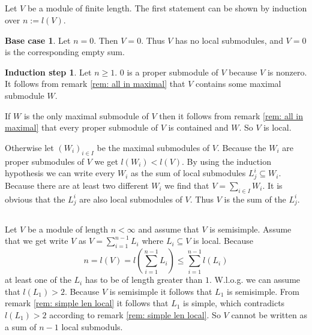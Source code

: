 \documentclass[a4paper,10pt]{article}
\theoremstyle{definition}
\newtheorem*{ia}{Base case}
\newtheorem*{is}{Induction step}
\begin{document}
\subsection{}
Let $V$ be a module of finite length.
The first statement can be shown by induction over $n := l(V)$.
\begin{ia}
 Let $n=0$. Then $V = 0$. Thus $V$ has no local submodules, and $V = 0$ is the corresponding empty sum.
\end{ia}
\begin{is}
 Let $n \geq 1$. $0$ is a proper submodule of $V$ because $V$ is nonzero. It follows from remark \ref{rem: all in maximal} that $V$ contains some maximal submodule $W$.
 
 If $W$ is the only maximal submodule of $V$ then it follows from remark \ref{rem: all in maximal} that every proper submodule of $V$ is contained and $W$. So $V$ is local.
 
 Otherwise let $(W_i)_{i \in I}$ be the maximal submodules of $V$. Because the $W_i$ are proper submodules of $V$ we get $l(W_i) < l(V)$. By using the induction hypothesis we can write every $W_i$ as the sum of local submodules $L^i_j \subseteq W_i$. Because there are at least two different $W_i$ we find that $V = \sum_{i \in I} W_i$. It is obvious that the $L^i_j$ are also local submodules of $V$. Thus $V$ is the sum of the $L^i_j$.
\end{is}


\subsection{}
Let $V$ be a module of length $n < \infty$ and assume that $V$ is semisimple. Assume that we get write $V$ as $V = \sum_{i=1}^{n-1} L_i$ where $L_i \subseteq V$ is local. Because
\[
 n = l(V) = l\left(\sum_{i=1}^{n-1} L_i\right) \leq \sum_{i=1}^{n-1} l(L_i)
\]
at least one of the $L_i$ has to be of length greater than $1$. W.l.o.g. we can assume that $l(L_1) > 2$. Because $V$ is semisimple it follows that $L_1$ is semisimple. From remark \ref{rem: simple len local} it follows that $L_1$ is simple, which contradicts $l(L_1) > 2$ according to remark \ref{rem: simple len local}. So $V$ cannot be written as a sum of $n-1$ local submoduls.
\end{document}
